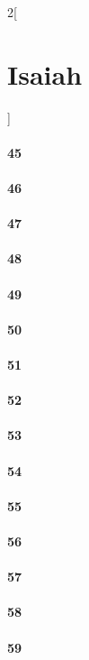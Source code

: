 \documentclass{book}
\begin{document}
\begin{multicols}{2}[\part{Isaiah}]
\subsection*{45}
\subsection*{46}
\subsection*{47}
\subsection*{48}
\subsection*{49}
\subsection*{50}
\subsection*{51}
\subsection*{52}
\subsection*{53}
\subsection*{54}
\subsection*{55}
\subsection*{56}
\subsection*{57}
\subsection*{58}
\subsection*{59}

\end{multicols}
\end{document}
